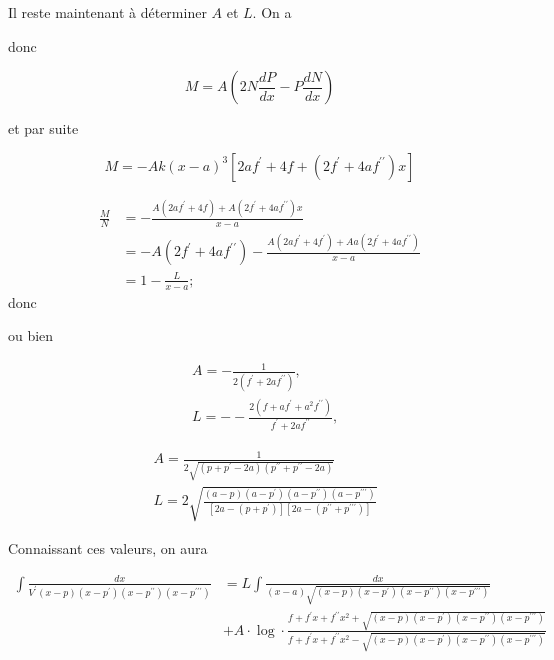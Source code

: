 \documentclass{article}
\begin{document}
Il reste maintenant à déterminer \(A\) et \(L\). On a

donc

\[
M=A\left(2 N \frac{d P}{d x}-P \frac{d N}{d x}\right)
\]

et par suite

\[
M=-A k(x-a)^{3}\left[2 a f^{\prime}+4 f+\left(2 f^{\prime}+4 a f^{\prime \prime}\right) x\right]
\]

\[
\begin{aligned}
\frac{M}{N} & =-\frac{A\left(2 a f^{\prime}+4 f\right)+A\left(2 f^{\prime}+4 a f^{\prime \prime}\right) x}{x-a} \\
& =-A\left(2 f^{\prime}+4 a f^{\prime \prime}\right)-\frac{A\left(2 a f^{\prime}+4 f^{\prime}\right)+A a\left(2 f^{\prime}+4 a f^{\prime \prime}\right)}{x-a} \\
& =1-\frac{L}{x-a} ;
\end{aligned}
\]
donc

ou bien

\[
\begin{aligned}
& A=-\frac{1}{2\left(f^{\prime}+2 a f^{\prime \prime}\right)}, \\
& L=--\frac{2\left(f+a f^{\prime}+a^{2} f^{\prime \prime}\right)}{f^{\prime}+2 a f^{\prime \prime}},
\end{aligned}
\]

\[
\begin{aligned}
& A=\frac{1}{2 \sqrt{\left(p+p^{\prime}-2 a\right)\left(p^{\prime \prime}+p^{\prime \prime}-2 a\right)}} \\
& L=2 \sqrt{\frac{(a-p)\left(a-p^{\prime}\right)\left(a-p^{\prime \prime}\right)\left(a-p^{\prime \prime \prime}\right)}{\left[2 a-\left(p+p^{\prime}\right)\right]\left[2 a-\left(p^{\prime \prime}+p^{\prime \prime \prime}\right)\right]}}
\end{aligned}
\]

Connaissant ces valeurs, on aura

\[
\begin{aligned}
\int \frac{d x}{V^{\prime}(x-p)\left(x-p^{\prime}\right)\left(x-p^{\prime \prime}\right)\left(x-p^{\prime \prime \prime}\right)} & =L \int \frac{d x}{(x-a) \sqrt{(x-p)\left(x-p^{\prime}\right)\left(x-p^{\prime \prime}\right)\left(x-p^{\prime \prime \prime}\right)}} \\
& +A \cdot \log \cdot \frac{f+f^{\prime} x+f^{\prime \prime} x^{2}+\sqrt{(x-p)\left(x-p^{\prime}\right)\left(x-p^{\prime \prime}\right)\left(x-p^{\prime \prime \prime}\right)}}{f+f^{\prime} x+f^{\prime \prime} x^{2}-\sqrt{(x-p)\left(x-p^{\prime}\right)\left(x-p^{\prime \prime}\right)\left(x-p^{\prime \prime \prime}\right)}}
\end{aligned}
\]
\end{document}
